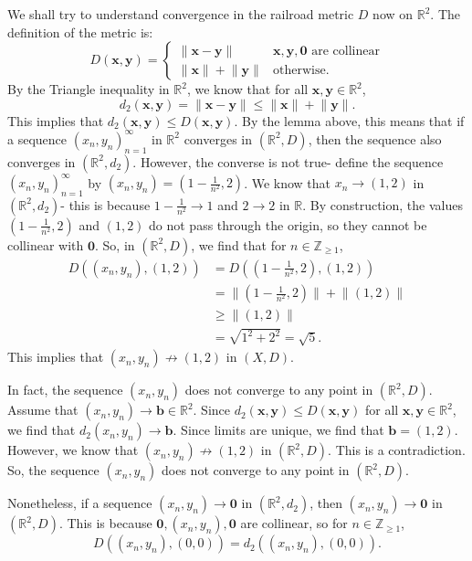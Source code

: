 \documentclass[a4paper, openany]{memoir}
\theoremstyle{definition}
\theoremstyle{plain}
\begin{document}
We shall try to understand convergence in the railroad metric $D$ now on $\mathbb{R}^2$. The definition of the metric is:
\[D(\bm{x}, \bm{y}) = \begin{cases}
\lVert \bm{x} - \bm{y} \rVert & \bm{x}, \bm{y}, \bm{0} \text{ are collinear} \\
\lVert \bm{x} \rVert + \lVert \bm{y} \rVert & \text{otherwise}.
\end{cases}\]
By the Triangle inequality in $\mathbb{R}^2$, we know that for all $\bm{x}, \bm{y} \in \mathbb{R}^2$,
\[d_2(\bm{x}, \bm{y}) = \lVert \bm{x} - \bm{y} \rVert \leqslant \lVert \bm{x} \rVert + \lVert \bm{y} \rVert.\]
This implies that $d_2(\bm{x}, \bm{y}) \leqslant D(\bm{x}, \bm{y})$. By the lemma above, this means that if a sequence $(x_n, y_n)_{n=1}^{\infty}$ in $\mathbb{R}^2$ converges in $(\mathbb{R}^2, D)$, then the  sequence also converges in $(\mathbb{R}^2, d_2)$. However, the converse is not true- define the sequence $(x_n, y_n)_{n=1}^{\infty}$ by $(x_n, y_n) = (1 - \frac{1}{n^2}, 2)$. We know that $x_n \to (1, 2)$ in $(\mathbb{R}^2, d_2)$- this is because $1 - \frac{1}{n^2} \to 1$ and $2 \to 2$ in $\mathbb{R}$. By construction, the values $(1 - \frac{1}{n^2}, 2)$ and $(1, 2)$ do not pass through the origin, so they cannot be collinear with $\bm{0}$. So, in $(\mathbb{R}^2, D)$, we find that for $n \in \mathbb{Z}_{\geqslant 1}$,
\begin{align*}
    D((x_n, y_n), (1, 2)) &= D((1 - \tfrac{1}{n^2}, 2), (1, 2)) \\
    &= \lVert (1 - \tfrac{1}{n^2}, 2) \rVert + \lVert (1, 2) \rVert \\
    &\geqslant \lVert (1, 2) \rVert \\
    &= \sqrt{1^2 + 2^2} = \sqrt{5}.
\end{align*}
This implies that $(x_n, y_n) \not\to (1, 2)$ in $(X, D)$. 

In fact, the sequence $(x_n, y_n)$ does not converge to any point in $(\mathbb{R}^2, D)$. Assume that $(x_n, y_n) \to \bm{b} \in \mathbb{R}^2$. Since $d_2(\bm{x}, \bm{y}) \leqslant D(\bm{x}, \bm{y})$ for all $\bm{x}, \bm{y} \in \mathbb{R}^2$, we find that $d_2(x_n, y_n) \to \bm{b}$. Since limits are unique, we find that $\bm{b} = (1, 2)$. However, we know that $(x_n, y_n) \not\to (1, 2)$ in $(\mathbb{R}^2, D)$. This is a contradiction. So, the sequence $(x_n, y_n)$ does not converge to any point in $(\mathbb{R}^2, D)$.

Nonetheless, if a sequence $(x_n, y_n) \to \bm{0}$ in $(\mathbb{R}^2, d_2)$, then $(x_n, y_n) \to \bm{0}$ in $(\mathbb{R}^2, D)$. This is because $\bm{0}, (x_n, y_n), \bm{0}$ are collinear, so for $n \in \mathbb{Z}_{\geqslant 1}$, 
\[D((x_n, y_n), (0, 0)) = d_2((x_n, y_n), (0, 0)).\]
\end{document}
